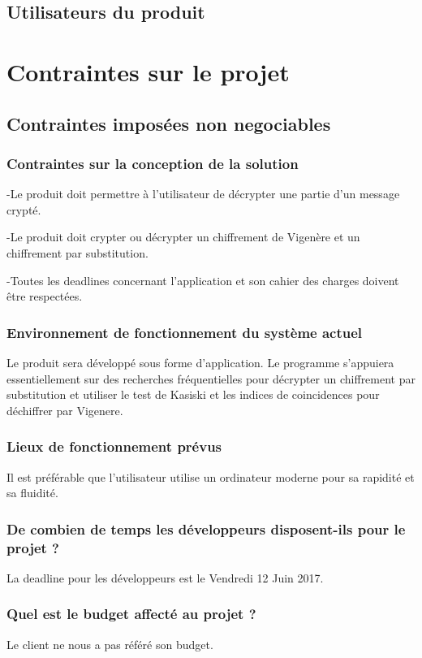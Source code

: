 \documentclass[a4]{article}
\begin{document}
		\subsection{Utilisateurs du produit}
			
	\section{Contraintes sur le projet}
		\subsection{Contraintes imposées non negociables} 
			\subsubsection{Contraintes sur la conception de la solution}
				-Le produit doit permettre à l'utilisateur de décrypter une partie d'un message crypté.

				-Le produit doit crypter ou décrypter un chiffrement de Vigenère et un chiffrement par substitution.

				-Toutes les deadlines concernant l'application et son cahier des charges doivent être respectées.
			\subsubsection{Environnement de fonctionnement du système actuel}
				Le produit sera développé sous forme d'application. 
				Le programme s'appuiera essentiellement sur des recherches fréquentielles pour décrypter un chiffrement par substitution et utiliser le test de Kasiski et les indices de coincidences pour déchiffrer par Vigenere.
			\subsubsection{Lieux de fonctionnement prévus}
				Il est préférable que l'utilisateur utilise un ordinateur moderne pour sa rapidité et sa fluidité.
			\subsubsection{ De combien de temps les développeurs disposent-ils pour le projet ?}
				La deadline pour les développeurs est le Vendredi 12 Juin 2017.
			\subsubsection{ Quel est le budget affecté au projet ?}
				Le client ne nous a pas référé son budget.
\end{document}

